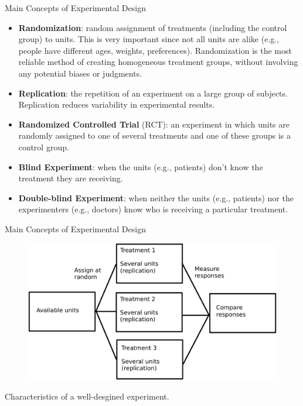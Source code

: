 \documentclass[handout]{beamer}
\begin{document}
\begin{frame}{Main Concepts of Experimental Design}
\scriptsize{


\begin{itemize}

 \item \textbf{Randomization}: random assignment of treatments (including the control group) to units. This is very important since not all units are alike (e.g., people have different ages, weights, preferences). Randomization is the most reliable method of creating homogeneous treatment groups, without involving any potential biases or judgments.
 
  \item \textbf{Replication}: the repetition of an experiment on a large group of subjects. Replication reduces variability in experimental results. 
  
  \item \textbf{Randomized Controlled Trial} (RCT): an experiment in which units are randomly assigned to one of several treatments and one of these groups is a control group.
  
  \item \textbf{Blind Experiment}:  when the units (e.g., patients) don't know the treatment they are receiving.
  
  \item \textbf{Double-blind Experiment}: when neither the units (e.g., patients) nor the experimenters (e.g., doctors) know who is receiving a particular treatment.
  
\end{itemize}



} 
\end{frame}


\begin{frame}{Main Concepts of Experimental Design}
\scriptsize{

\begin{figure}[h!]
	\centering
	\includegraphics[scale=0.6]{pics/experiment.pdf}
\end{figure}

Characteristics of a well-desgined experiment.


} 
\end{frame}
\end{document}
